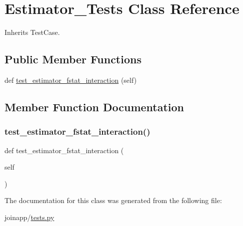 \hypertarget{classjoinapp_1_1tests_1_1_estimator___tests}{}\section{Estimator\+\_\+\+Tests Class Reference}
\label{classjoinapp_1_1tests_1_1_estimator___tests}


Inherits Test\+Case.

\subsection*{Public Member Functions}
\begin{DoxyCompactItemize}
\item 
def \mbox{\hyperlink{classjoinapp_1_1tests_1_1_estimator___tests_af50e64ff84b21c0bb1399668efd9f96d}{test\+\_\+estimator\+\_\+fstat\+\_\+interaction}} (self)
\end{DoxyCompactItemize}


\subsection{Member Function Documentation}
\mbox{\label{classjoinapp_1_1tests_1_1_estimator___tests_af50e64ff84b21c0bb1399668efd9f96d}} 
\subsubsection{\texorpdfstring{test\_estimator\_fstat\_interaction()}{test\_estimator\_fstat\_interaction()}}
{\footnotesize\ttfamily def test\+\_\+estimator\+\_\+fstat\+\_\+interaction (\begin{DoxyParamCaption}\item[{}]{self }\end{DoxyParamCaption})}



The documentation for this class was generated from the following file\+:\begin{DoxyCompactItemize}
\item 
joinapp/\mbox{\hyperlink{tests_8py}{tests.\+py}}\end{DoxyCompactItemize}
